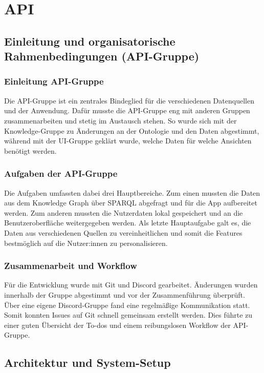 \section{API}

\subsection{Einleitung und organisatorische Rahmenbedingungen (API-Gruppe)}
\subsubsection{Einleitung API-Gruppe}

Die API-Gruppe ist ein zentrales Bindeglied für die verschiedenen Datenquellen und der Anwendung. Dafür musste die API-Gruppe eng mit anderen Gruppen zusammenarbeiten und stetig im Austausch stehen. So wurde sich mit der Knowledge-Gruppe zu Änderungen an der Ontologie und den Daten abgestimmt, während mit der UI-Gruppe geklärt wurde, welche Daten für welche Ansichten benötigt werden.

\subsubsection{Aufgaben der API-Gruppe}

Die Aufgaben umfassten dabei drei Hauptbereiche. Zum einen mussten die Daten aus dem Knowledge Graph über SPARQL abgefragt und für die App aufbereitet werden. Zum anderen mussten die Nutzerdaten lokal gespeichert und an die Benutzeroberfläche weitergegeben werden. Als letzte Hauptaufgabe galt es, die Daten aus verschiedenen Quellen zu vereinheitlichen und somit die Features bestmöglich auf die Nutzer:innen zu personalisieren.

\subsubsection{Zusammenarbeit und Workflow}

Für die Entwicklung wurde mit Git und Discord gearbeitet. Änderungen wurden innerhalb der Gruppe abgestimmt und vor der Zusammenführung überprüft. Über eine eigene Discord-Gruppe fand eine regelmäßige Kommunikation statt. Somit konnten Issues auf Git schnell gemeinsam erstellt werden. Dies führte zu einer guten Übersicht der To-dos und einem reibungslosen Workflow der API-Gruppe.


\subsection{Architektur und System-Setup}
